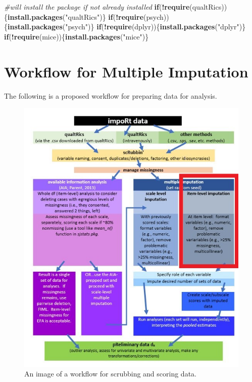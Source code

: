 \documentclass[
  11pt,
]{book}
\newenvironment{Shaded}{\begin{snugshade}}{\end{snugshade}}
\newcommand{\CommentTok}[1]{\textcolor[rgb]{0.37,0.37,0.37}{\textit{#1}}}
\newcommand{\ControlFlowTok}[1]{\textcolor[rgb]{0.27,0.27,0.27}{\textbf{#1}}}
\newcommand{\FunctionTok}[1]{\textcolor[rgb]{0.27,0.27,0.27}{\textbf{#1}}}
\newcommand{\NormalTok}[1]{#1}
\newcommand{\SpecialCharTok}[1]{\textcolor[rgb]{0.43,0.43,0.43}{\textbf{#1}}}
\newcommand{\StringTok}[1]{\textcolor[rgb]{0.5,0.5,0.5}{#1}}
\begin{document}
\begin{Shaded}
\begin{Highlighting}[]
\CommentTok{\#will install the package if not already installed}
\ControlFlowTok{if}\NormalTok{(}\SpecialCharTok{!}\FunctionTok{require}\NormalTok{(qualtRics))\{}\FunctionTok{install.packages}\NormalTok{(}\StringTok{"qualtRics"}\NormalTok{)\}}
\ControlFlowTok{if}\NormalTok{(}\SpecialCharTok{!}\FunctionTok{require}\NormalTok{(psych))\{}\FunctionTok{install.packages}\NormalTok{(}\StringTok{"psych"}\NormalTok{)\}}
\ControlFlowTok{if}\NormalTok{(}\SpecialCharTok{!}\FunctionTok{require}\NormalTok{(dplyr))\{}\FunctionTok{install.packages}\NormalTok{(}\StringTok{"dplyr"}\NormalTok{)\}}
\ControlFlowTok{if}\NormalTok{(}\SpecialCharTok{!}\FunctionTok{require}\NormalTok{(mice))\{}\FunctionTok{install.packages}\NormalTok{(}\StringTok{"mice"}\NormalTok{)\}}
\end{Highlighting}
\end{Shaded}

\hypertarget{workflow-for-multiple-imputation}{%
\section{Workflow for Multiple Imputation}\label{workflow-for-multiple-imputation}}

The following is a proposed workflow for preparing data for analysis.

\begin{figure}
\centering
\includegraphics{images/Ch05/scrubscore_mimp_itemlvl.jpg}
\caption{An image of a workflow for scrubbing and scoring data.}
\end{figure}
\end{document}
